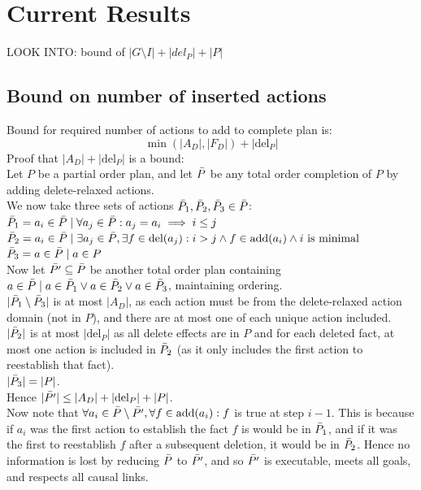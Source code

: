 \documentclass[runningheads]{llncs}
\begin{document}
\section{Current Results}
LOOK INTO: bound of $|G\setminus I|+|del_P|+|P|$
\subsection{Bound on number of inserted actions}
Bound for required number of actions to add to complete plan is: \[\min (|A_D|,|F_D|)+ |\text{del}_P|\]
Proof that $|A_D|+ |\text{del}_P|$ is a bound:\\
Let $P$ be a partial order plan, and let $\Bar{P}$ be any total order completion of $P$ by adding delete-relaxed actions.\\
We now take three sets of actions $\Bar{P}_1,\Bar{P}_2,\Bar{P}_3\in\Bar{P}$:\\
$\Bar{P}_1=a_i\in\Bar{P}\mid \forall a_j\in\Bar{P}: a_j=a_i\implies i\leq j$\\
$\Bar{P}_2=a_i\in\Bar{P}\mid \exists a_j\in\Bar{P},\exists f\in \text{del}(a_j):i>j \wedge f\in \text{add}(a_i) \wedge i\text{ is minimal}$\\
$\Bar{P}_3=a\in\Bar{P}\mid a\in P$\\
Now let $\Bar{P'}\subseteq\Bar{P}$ be another total order plan containing $a\in \Bar{P}\mid a\in\Bar{P}_1\vee a\in\Bar{P}_2\vee a\in\Bar{P}_3$, maintaining ordering.\\
$|\Bar{P}_1\setminus \Bar{P}_3|$ is at most $|A_D|$, as each action must be from the delete-relaxed action domain (not in $P$), and there are at most one of each unique action included.\\
$|\Bar{P}_2|$ is at most $|\text{del}_P|$ as all delete effects are in $P$ and for each deleted fact, at most one action is included in $\Bar{P}_2$ (as it only includes the first action to reestablish that fact).\\
$|\Bar{P}_3|=|P|$.\\
Hence $|\Bar{P'}|\leq |A_D|+ |\text{del}_P| + |P|$.\\
Now note that $\forall a_i\in \Bar{P}\setminus\Bar{P'},\forall f\in \text{add}(a_i): f$ is true at step $i-1$. This is because if $a_i$ was the first action to establish the fact $f$ is would be in $\Bar{P}_1$, and if it was the first to reestablish $f$ after a subsequent deletion, it would be in $\Bar{P}_2$. Hence no information is lost by reducing $\Bar{P}$ to $\Bar{P'}$, and so $\Bar{P'}$ is executable, meets all goals, and respects all causal links.\\
\end{document}
